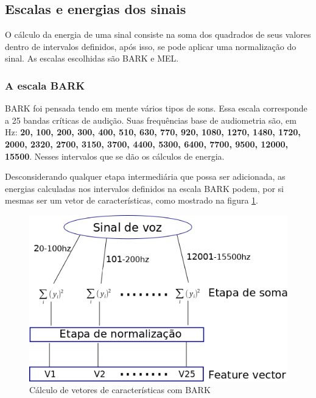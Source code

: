 \subsection{Escalas e energias dos sinais}
	\par O cálculo da energia de uma sinal consiste na soma dos quadrados de seus valores dentro de intervalos definidos, após  isso, se pode aplicar uma normalização do sinal. As escalas escolhidas são BARK e MEL.
	\subsubsection{A escala BARK}
		\par BARK foi pensada tendo em mente vários tipos de sons. Essa escala corresponde a 25 bandas críticas de audição. Suas frequências base de audiometria são, em Hz: \textbf{20, 100, 200, 300, 400, 510, 630, 770, 920, 1080, 1270, 1480, 1720, 2000, 2320, 2700, 3150, 3700, 4400, 5300, 6400, 7700, 9500, 12000, 15500}. Nesses intervalos que se dão os cálculos de energia.
		\par Desconsiderando qualquer etapa intermediária que possa ser adicionada, as energias calculadas nos intervalos definidos na escala BARK podem, por si mesmas ser um vetor de características, como mostrado na figura \ref{fig:barkfeaturevect}.
		\begin{figure}[h]
			\centering
			\includegraphics[width=0.6\linewidth]{images/barkFeatureVect}
			\caption{Cálculo de vetores de características com BARK}
			\label{fig:barkfeaturevect}
		\end{figure}
